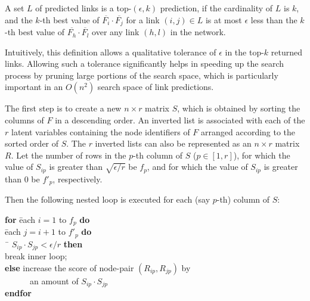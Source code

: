 \begin{definition}[top-$(\epsilon, k)$ predictions]
A set $L$ of predicted links is a top-$(\epsilon, k)$ prediction, if
the cardinality of $L$ is $k$, and the $k$-th best  value of
$\overline{F_i} \cdot \overline{F_j}$ for a link $(i, j) \in L$ is
at most $\epsilon$ less than the $k$-th best value of
$\overline{F_h} \cdot \overline{F_l}$ over any link $(h , l)$ in the
network.
\end{definition}
Intuitively, this definition allows a qualitative  tolerance of
$\epsilon$ in the top-$k$ returned links. Allowing such a tolerance
significantly helps in speeding up the search process by pruning
large portions of the search space, which is particularly important
in an $O(n^2)$ search space of link predictions.

The first step is to create a new $n \times r$ matrix $S$, which is
obtained by sorting the columns of $F$ in a descending order. An inverted list is
associated with each of the $r$ latent variables containing the node
identifiers  of $F$ arranged according to the sorted order of $S$. The
$r$ inverted lists can also be represented as an $n \times r$ matrix
$R$. Let the number of rows in the $p$-th column of $S$ ($p\in[1, r]$), for which
the value of $S_{ip}$ is greater than $\sqrt{\epsilon/r}$ be $f_p$, and for which the value of $S_{ip}$ is greater than 0 be $f'_p$, respectively.

Then the following nested loop is executed for each (say $p$-th) column of $S$:

\vspace{-1ex}
\begin{tabbing}\hspace{5ex}\=
{\bf for} \= each $i=1$ to $f_p$ {\bf do}\\
\> \= each $j=i+1$ to $f'_p$ {\bf do}\\
\>\>\ \= $S_{ip} \cdot S_{jp} < \epsilon/r$ {\bf then}\\
\>\>\>\>break inner loop; \\
\>\>\> {\bf else} increase the score of node-pair $(R_{ip}, R_{jp})$
by \\
\>\>\> \ \ \ \ \ \ an amount of $S_{ip} \cdot S_{jp}$\\
\>\> {\bf endfor}\\
\end{tabbing}
\vspace{-1ex}

